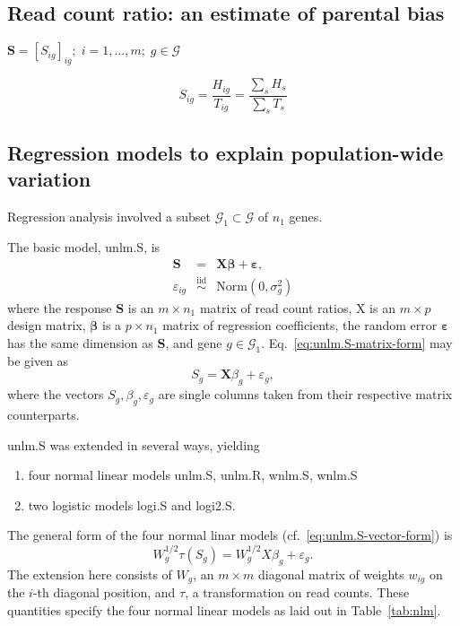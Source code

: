 \documentclass[letterpaper]{article}
\begin{document}
\subsection{Read count ratio: an estimate of parental bias}

\(\mathbf{S} = [S_{ig}]_{ig};\; i=1,...,m; \; g\in\mathcal{G}\)

\begin{equation}
S_{ig} = \frac{H_{ig}}{T_{ig}}= \frac{\sum_s H_s}{\sum_sT_s}
\end{equation}

\subsection{Regression models to explain population-wide variation}

Regression analysis involved a subset \(\mathcal{G}_1\subset\mathcal{G}\) of
\(n_1\) genes.

The basic model, unlm.S, is
\begin{eqnarray}
\mathbf{S} &=& \mathbf{X} \boldsymbol{\beta} + \boldsymbol{\varepsilon},
\label{eq:unlm.S-matrix-form} \\
\varepsilon_{ig} &\overset{\mathrm{iid}}{\sim}& \mathrm{Norm}(0, \sigma^2_g)
\end{eqnarray}
where the response \(\mathbf{S}\) is an \(m\times n_1\) matrix of read count ratios,
\(\mathrm{X}\) is an \(m\times p\) design matrix, \(\boldsymbol{\beta}\) is a \(p\times n_1\) matrix of regression
coefficients, the random error \(\boldsymbol{\varepsilon}\) has the same
dimension as \(\mathbf{S}\), and gene \(g\in \mathcal{G}_1\).  Eq.~\ref{eq:unlm.S-matrix-form} may be given as
\begin{equation}
S_g = \mathbf{X} \beta_g + \varepsilon_g,
\label{eq:unlm.S-vector-form}
\end{equation}
where the vectors \(S_g, \beta_g, \varepsilon_g\)
are single columns taken from their respective matrix counterparts.

unlm.S was extended in several ways, yielding
\begin{enumerate}
\item four normal linear models unlm.S, unlm.R, wnlm.S, wnlm.S
\item two logistic models logi.S and logi2.S.
\end{enumerate}

The general form of the four normal linar models
(cf.~\ref{eq:unlm.S-vector-form}) is
\begin{equation}
W_g^{1/2} \tau(S_g) = W_g^{1/2} X \beta_g + \varepsilon_g.
\label{eq:nlm-general}
\end{equation}
The extension here consists of \(W_g\), an \(m\times m\) diagonal matrix of
weights \(w_{ig}\) on the \(i\)-th diagonal position, and \(\tau\), a
transformation on read counts.  These quantities specify the four normal
linear models as laid out in Table~\ref{tab:nlm}.
\end{document}

